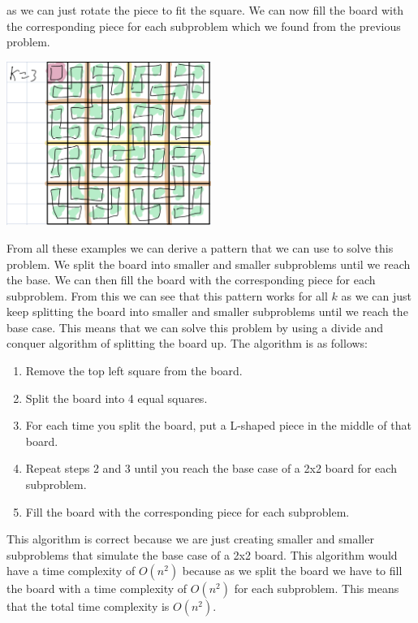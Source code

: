 \documentclass[12pt,letterpaper]{article}
\begin{document}
as we can just rotate the piece to fit the square. We can now fill the board with the corresponding
piece for each subproblem which we found from the previous problem.
\begin{center}
    \includegraphics[width=0.5\textwidth]{images/1.3.jpeg}
\end{center}
From all these examples we can derive a pattern that we can use to solve this problem. We split the board into smaller and smaller subproblems until we reach the base.
We can then fill the board with the corresponding piece for each subproblem. From this we can see that this
pattern works for all $k$ as we can just keep splitting the board into smaller and smaller subproblems
until we reach the base case. This means that we can solve this problem by using a divide and conquer
algorithm of splitting the board up. The algorithm is as follows:
\begin{enumerate}
    \item Remove the top left square from the board.
    \item Split the board into 4 equal squares.
    \item For each time you split the board, put a L-shaped piece in the middle of that board.
    \item Repeat steps 2 and 3 until you reach the base case of a 2x2 board for each subproblem.
    \item Fill the board with the corresponding piece for each subproblem.
\end{enumerate}
This algorithm is correct because we are just creating smaller and smaller subproblems that 
simulate the base case of a 2x2 board. This algorithm would have a time complexity of $O(n^2)$
because as we split the board we have to fill the board with a time complexity of $O(n^2)$ for each
subproblem. This means that the total time complexity is $O(n^2)$.
\end{document}
